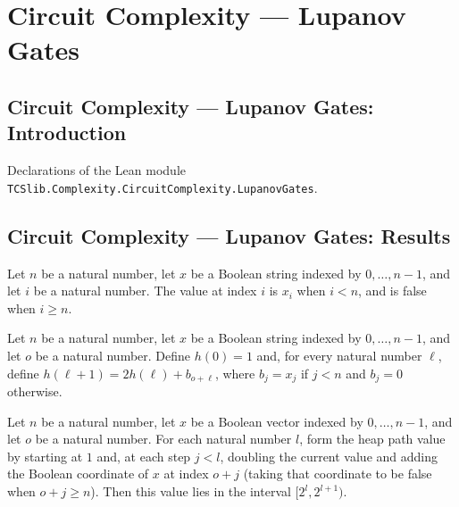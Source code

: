 \section{Circuit Complexity --- Lupanov Gates}
\subsection*{Circuit Complexity --- Lupanov Gates: Introduction}

Declarations of the Lean module \texttt{TCSlib.Complexity.CircuitComplexity.LupanovGates}.

\subsection*{Circuit Complexity --- Lupanov Gates: Results}

\begin{definition}
\label{BoolCircuit.Lupanov.xget}
\leanok
Let $n$ be a natural number, let $x$ be a Boolean string indexed by $0,\ldots,n-1$, and
let $i$ be a natural number. The value at index $i$ is $x_i$ when $i<n$, and is false
when $i\ge n$.
\end{definition}

\begin{definition}
\label{BoolCircuit.Lupanov.heapPath}
\leanok
{}
Let $n$ be a natural number, let $x$ be a Boolean string indexed by $0,\ldots,n-1$, and
let $o$ be a natural number. Define $h(0)=1$ and, for every natural number $\ell$,
define $h(\ell+1)=2h(\ell)+b_{o+\ell}$, where $b_j=x_j$ if $j<n$ and $b_j=0$ otherwise.
\end{definition}

\begin{theorem}
\label{BoolCircuit.Lupanov.heapPath_bounds}
\leanok
{}
Let $n$ be a natural number, let $x$ be a Boolean vector indexed by $0,\ldots,n-1$, and
let $o$ be a natural number. For each natural number $l$, form the heap path value by
starting at $1$ and, at each step $j<l$, doubling the current value and adding the
Boolean coordinate of $x$ at index $o+j$ (taking that coordinate to be false when
$o+j\ge n$). Then this value lies in the interval $[2^l,2^{l+1})$.
\end{theorem}

